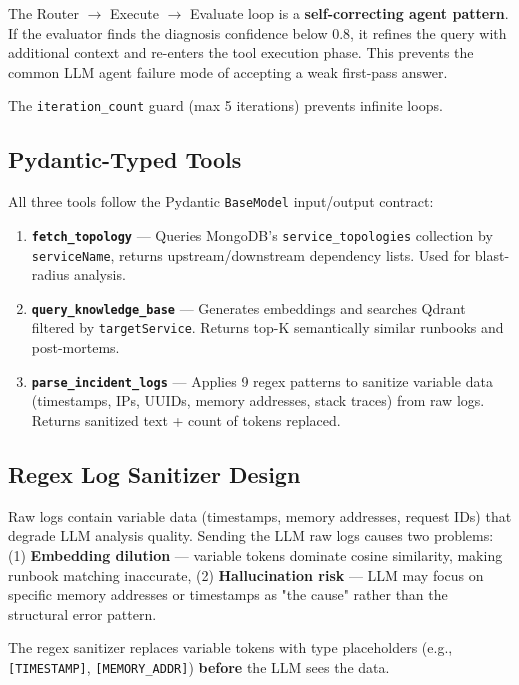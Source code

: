 \documentclass[11pt,a4paper]{article}
\begin{document}
\begin{tcolorbox}[colback=primary!5, colframe=primary, sharp corners, title=\textbf{Why a loop architecture?}]
The Router $\rightarrow$ Execute $\rightarrow$ Evaluate loop is a \textbf{self-correcting agent pattern}.
If the evaluator finds the diagnosis confidence below 0.8, it refines the query with
additional context and re-enters the tool execution phase. This prevents the common LLM
agent failure mode of accepting a weak first-pass answer.

The \texttt{iteration\_count} guard (max 5 iterations) prevents infinite loops.
\end{tcolorbox}

\subsection{Pydantic-Typed Tools}

All three tools follow the Pydantic \texttt{BaseModel} input/output contract:

\begin{enumerate}[leftmargin=*,itemsep=4pt]
  \item \textbf{\texttt{fetch\_topology}} — Queries MongoDB's \texttt{service\_topologies} collection by \texttt{serviceName}, returns upstream/downstream dependency lists. Used for blast-radius analysis.
  \item \textbf{\texttt{query\_knowledge\_base}} — Generates embeddings and searches Qdrant filtered by \texttt{targetService}. Returns top-K semantically similar runbooks and post-mortems.
  \item \textbf{\texttt{parse\_incident\_logs}} — Applies 9 regex patterns to sanitize variable data (timestamps, IPs, UUIDs, memory addresses, stack traces) from raw logs. Returns sanitized text + count of tokens replaced.
\end{enumerate}

\subsection{Regex Log Sanitizer Design}

\begin{decisionbox}
Raw logs contain variable data (timestamps, memory addresses, request IDs) that degrade
LLM analysis quality. Sending the LLM raw logs causes two problems: (1) \textbf{Embedding dilution} — variable tokens dominate cosine similarity, making runbook matching inaccurate, (2) \textbf{Hallucination risk} — LLM may focus on specific memory addresses or timestamps as "the cause" rather than the structural error pattern.

The regex sanitizer replaces variable tokens with type placeholders (e.g., \texttt{[TIMESTAMP]},
\texttt{[MEMORY\_ADDR]}) \textbf{before} the LLM sees the data.
\end{decisionbox}
\end{document}
